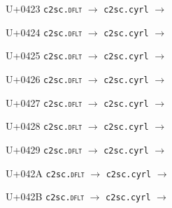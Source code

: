 \documentclass{article}
\begin{document}
\begin{substitutions}
\goodbreak

U+0423  \linebreak
    \texttt{c2sc.\textsc{dflt}} $\to$  \linebreak
    \texttt{c2sc.cyrl} $\to$  

\goodbreak

U+0424  \linebreak
    \texttt{c2sc.\textsc{dflt}} $\to$  \linebreak
    \texttt{c2sc.cyrl} $\to$  

\goodbreak

U+0425  \linebreak
    \texttt{c2sc.\textsc{dflt}} $\to$  \linebreak
    \texttt{c2sc.cyrl} $\to$  

\goodbreak

U+0426  \linebreak
    \texttt{c2sc.\textsc{dflt}} $\to$  \linebreak
    \texttt{c2sc.cyrl} $\to$  

\goodbreak

U+0427  \linebreak
    \texttt{c2sc.\textsc{dflt}} $\to$  \linebreak
    \texttt{c2sc.cyrl} $\to$  

\goodbreak

U+0428  \linebreak
    \texttt{c2sc.\textsc{dflt}} $\to$  \linebreak
    \texttt{c2sc.cyrl} $\to$  

\goodbreak

U+0429  \linebreak
    \texttt{c2sc.\textsc{dflt}} $\to$  \linebreak
    \texttt{c2sc.cyrl} $\to$  

\goodbreak

U+042A  \linebreak
    \texttt{c2sc.\textsc{dflt}} $\to$  \linebreak
    \texttt{c2sc.cyrl} $\to$  

\goodbreak

U+042B  \linebreak
    \texttt{c2sc.\textsc{dflt}} $\to$  \linebreak
    \texttt{c2sc.cyrl} $\to$  


\end{substitutions}
\end{document}
